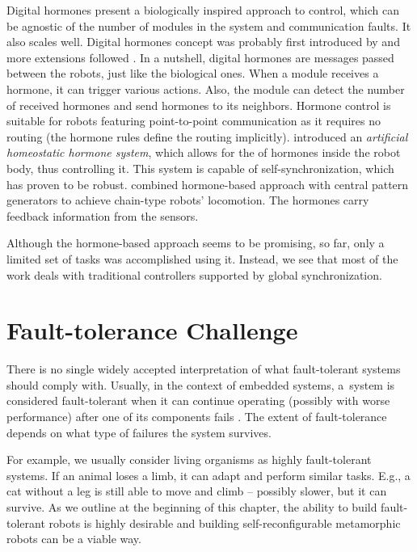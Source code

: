 Digital hormones present a biologically inspired approach to control, which can
be agnostic of the number of modules in the system and communication faults. It
also scales well. Digital hormones concept was probably first introduced by
\textcite{DBLP:conf/agents/ShenLW00} and more extensions followed
\cite{DBLP:conf/icra/SalemiSW01, DBLP:journals/trob/ShenSW02}. In a nutshell,
digital hormones are messages passed between the robots, just like the
biological ones. When a module receives a hormone, it can trigger various
actions. Also, the module can detect the number of received hormones and send
hormones to its neighbors. Hormone control is suitable for robots featuring
point-to-point communication as it requires no routing (the hormone rules define
the routing implicitly). \textcite{DBLP:conf/cec/HamannSSC10} introduced an
\emph{artificial homeostatic hormone system}, which allows for the
 of hormones inside the robot body, thus controlling it. This
system is capable of self-synchronization, which has proven to be robust.
\textcite{DBLP:conf/icra/MorenoG11} combined hormone-based approach with central
pattern generators to achieve chain-type robots' locomotion. The hormones
carry feedback information from the sensors.

Although the hormone-based approach seems to be promising, so far, only a
limited set of tasks was accomplished using it. Instead, we see that most of the
work deals with traditional controllers supported by global synchronization.

\section{Fault-tolerance Challenge}

There is no single widely accepted interpretation of what fault-tolerant systems
should comply with. Usually, in the context of embedded systems, a~system is
considered fault-tolerant when it can continue operating (possibly with
worse performance) after one of its components fails
\cite{DBLP:journals/micro/Johnson84}. The extent of fault-tolerance depends on
what type of failures the system survives.

For example, we usually consider living organisms as highly fault-tolerant
systems. If an animal loses a limb, it can adapt and perform similar
tasks. E.g., a cat without a leg is still able to move and climb -- possibly
slower, but it can survive. As we outline at the beginning of this
chapter, the ability to build fault-tolerant robots is highly desirable and
building self-reconfigurable metamorphic robots can be a viable way.


